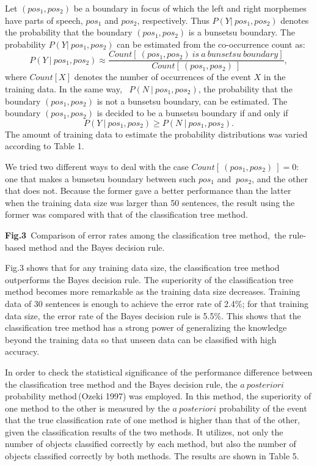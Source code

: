 Let $(pos_1, pos_2)$ be a boundary in focus of which
the left and right morphemes have parts of speech, $pos_1$ and $pos_2$,
respectively. Thus
$P(Y|\ pos_1, pos_2)$ denotes the probability that the boundary $(pos_1, pos_2)$ 
is a
bunsetsu boundary. The probability $P(Y|\ pos_1, pos_2)$ can be estimated
from the
co-occurrence count as:
\[P(Y\ |\ pos_1,pos_2) \approx \frac{Count[\ (pos_1,pos_2)\ is\ a\
bunsetsu\ boundary]}{Count[\ (
pos_1,pos_2)\ ]},
\]
where $Count[X]$ denotes the number of occurrences of the event $X$ in the training data.
In the same way, \ $P(N\ |\ pos_1,pos_2)$,  the  probability that the
boundary $(pos_1,pos_2)$ is not   a
bunsetsu boundary, can  be estimated.
The boundary $(pos_1,pos_2)$ is decided to be  a bunsetsu boundary
if and only if
\[ P(Y\ |\ pos_1,pos_2) \geq  P(N\ |\ pos_1,pos_2).\]
The amount of training data to estimate the probability distributions
was varied according to Table 1.

We tried two different ways to deal with  the case $Count[\ (pos_1,pos_2)\ ]=0$: one that makes a bunsetsu boundary between such $pos_1$ and $\ pos_2$,
and the other that  does not.
Because the former gave a better performance than the latter when the
training data size was larger than 50 sentences, 
the result using  the former  was 
compared  with that of the classification tree method.\\
\begin{table}[t]
\hspace*{10mm}
\begin{center}
{\bf Fig.3}\ Comparison of error rates among the classification
tree method,\ the rule-based method and the Bayes decision rule. 
\end{center}
\end{table}
  Fig.3 shows that for any training data size, the classification tree method
outperforms   the Bayes decision rule. The superiority of the
classification tree method
becomes
more remarkable as the training data size decreases. Training data of 
30 sentences is enough to achieve the error rate of 2.4\%; for that 
training data size, the error rate of the Bayes decision rule is
 5.5\%. This shows that the classification tree method has a strong power of
generalizing the knowledge beyond the training data so that unseen
data can  be
classified with high accuracy.

  In order to check the statistical significance of the performance
difference between the classification tree method and the Bayes decision rule, 
the $a\ posteriori$ probability method\,(Ozeki 1997) was employed. In this method, the
superiority of  one method to the other
is measured by the $a\ posteriori$ probability  of the event that the true 
classification rate of one method  is higher than that of the other, given the
classification results of the two methods. It utilizes, not only the number of objects classified
correctly by each method, but also the number of objects classified
correctly by  both methods.
The results are shown in Table 5.

